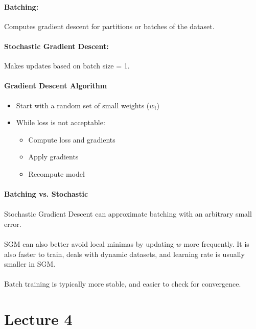 \documentclass[letterpaper,12pt]{article}
\begin{document}
\paragraph{Batching:} Computes gradient descent for partitions or batches of the dataset.
\paragraph{Stochastic Gradient Descent:}
Makes updates based on batch size = 1.

\paragraph{Gradient Descent Algorithm}
\begin{itemize}
    \item Start with a random set of small weights ($w_i$)
    \item While loss is not acceptable:
        \begin{itemize}
            \item Compute loss and gradients
            \item Apply gradients
            \item Recompute model
        \end{itemize}
\end{itemize}

\paragraph{Batching vs. Stochastic}
\paragraph{}Stochastic Gradient Descent can approximate batching with an arbitrary small error.
\paragraph{}SGM can also better avoid local minimas by updating $w$ more frequently. It is also
faster to train, deals with dynamic datasets, and learning rate is usually smaller in SGM.
\paragraph{}Batch training is typically more stable, and easier to check for convergence.
\section*{Lecture 4}
\end{document}
